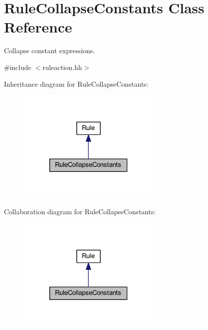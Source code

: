 \hypertarget{class_rule_collapse_constants}{}\section{Rule\+Collapse\+Constants Class Reference}
\label{class_rule_collapse_constants}


Collapse constant expressions.  




{\ttfamily \#include $<$ruleaction.\+hh$>$}



Inheritance diagram for Rule\+Collapse\+Constants\+:
\nopagebreak
\begin{figure}[H]
\begin{center}
\leavevmode
\includegraphics[width=198pt]{class_rule_collapse_constants__inherit__graph}
\end{center}
\end{figure}


Collaboration diagram for Rule\+Collapse\+Constants\+:
\nopagebreak
\begin{figure}[H]
\begin{center}
\leavevmode
\includegraphics[width=198pt]{class_rule_collapse_constants__coll__graph}
\end{center}
\end{figure}
